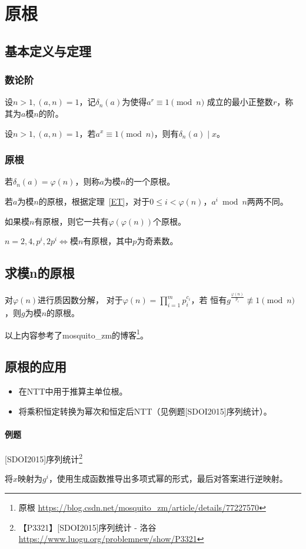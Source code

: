 \section{原根}\label{PrimitiveRoot}
\subsection{基本定义与定理}
\subsubsection{数论阶}
设$n>1,(a,n)=1$，记$\delta_n(a)$为使得$a^r\equiv 1 \pmod{n}$
成立的最小正整数$r$，称其为$a$模$n$的阶。

\begin{theorem}
	设$n>1,(a,n)=1$，若$a^x\equiv 1 \pmod{n}$，则有$\delta_n(a)\mid x$。
\end{theorem}

\subsubsection{原根}
若$\delta_n(a)=\varphi(n)$，则称$a$为模$n$的一个原根。

若$a$为模$n$的原根，根据定理~\ref{ET}，对于$0\leq i< \varphi(n)$，$a^i\bmod{n}$两两不同。

\begin{theorem}
	如果模$n$有原根，则它一共有$\varphi(\varphi(n))$个原根。
\end{theorem}

\begin{theorem}
	$n=2,4,p^i,2p^i\Leftrightarrow$模$n$有原根，其中$p$为奇素数。
\end{theorem}

\subsection{求模n的原根}

对$\varphi(n)$进行质因数分解，
对于$\displaystyle \varphi(n)=\prod_{i=1}^m{p_i^{c_i}}$，若
恒有$g^\frac{\varphi(n)}{p_i}\not\equiv 1 \pmod{n}$，则$g$为模$n$的原根。

以上内容参考了mosquito\_zm的博客\footnote{原根
	\url{https://blog.csdn.net/mosquito\_zm/article/details/77227570}}。
\subsection{原根的应用}
\begin{itemize}
	\item 在NTT中用于推算主单位根。
	\item 将乘积恒定转换为幂次和恒定后NTT（见例题[SDOI2015]序列统计）。
\end{itemize}
\paragraph{例题} [SDOI2015]序列统计\footnote{【P3321】[SDOI2015]序列统计 - 洛谷
\url{https://www.luogu.org/problemnew/show/P3321}}

将$x$映射为$g^i$，使用生成函数推导出多项式幂的形式，最后对答案进行逆映射。


